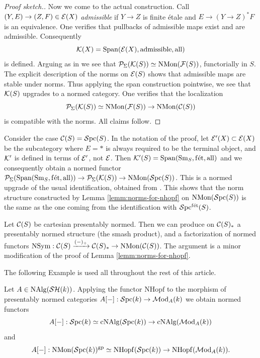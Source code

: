\documentclass{amsart}
\numberwithin{proposition}{section}
\numberwithin{equation}{section}
\def\fet{\mathrm{f\acute et}}
\def\all{\mathrm{all}}
\def\NSym{\mathrm{NSym}}
\def\NMon{\mathrm{NMon}}
\def\NHopf{\mathrm{NHopf}}
\def\cNAlg{\mathrm{cNAlg}}
\begin{document}
\begin{proof}[Proof sketch.]
Now we come to the actual construction.
Call $(Y, E) \to (Z, F) \in \mathcal E(X)$ \emph{admissible} if $Y \to Z$ is finite étale and $E \to (Y \to Z)^* F$ is an equivalence.
One verifies that pullbacks of admissible maps exist and are admissible.
Consequently \[ \scr K(X) = \Span(\scr E(X), \mathrm{admissible}, \all) \] is defined.
Arguing as in \cite[Lemma 16.17, Remark 16.18]{bachmann-norms} we see that $\PSh_\Sigma(\scr K(S)) \wequi \NMon(\scr F(S))$, functorially in $S$.
The explicit description of the norms on $\mathcal E(S)$ shows that admissible maps are stable under norms.
Thus applying the span construction pointwise, we see that $\mathcal K(S)$ upgrades to a  normed category.
One verifies that the localization \[ \PSh_\Sigma(\scr K(S)) \wequi \NMon(\scr F(S)) \to \NMon(\scr C(S)) \] is compatible with the norms.
All claims follow.
\end{proof}

\begin{remark}
Consider the case $\mathcal C(S) = \mathcal{S}\mathrm{pc}{}(S)$.
In the notation of the proof, let $\mathcal E'(X) \subset \mathcal E(X)$ be the subcategory where $E=*$ is always required to be the terminal object, and $\mathcal K'$ is defined in terms of $\mathcal E'$, not $\mathcal E$.
Then $\scr K'(S) = \Span(\Sm_S, \fet, \all)$ and we consequently obtain a normed functor $\PSh_\Sigma(\Span(\Sm_S, \fet, \all)) \to \PSh_\Sigma(\scr K(S)) \to \NMon(\Spc(S))$.
This is a normed upgrade of the usual identification, obtained from \cite[Remark 16.18]{bachmann-norms}.
This shows that the norm structure constructed by Lemma \ref{lemm:norms-for-nhopf} on $\NMon(\Spc(S))$ is the same as the one coming from the identification with $\Spc^\fet(S)$.
\end{remark}

\begin{remark} \label{rmk:smash-product-normed-str}
Let $\mathcal C(S)$ be cartesian presentably normed.
Then we can produce on $\mathcal C(S)_*$ a presentably normed structure (the smash product), and a factorization of normed functors $\NSym: \scr C(S) \xrightarrow{(\ph)_+} \scr C(S)_* \to \NMon(\scr C(S))$.
The argument is a minor modification of the proof of Lemma \ref{lemm:norms-for-nhopf}.
\end{remark}

The following Example is used all throughout the rest of this article.
\begin{example} \label{ex:homology-hopf-algebra}
Let $A \in \mathrm{NAlg}(\mathcal{SH}(k))$.
Applying the functor $\NHopf$ to the morphism of presentably normed categories $A[\mathord-]: \mathcal{S}\mathrm{pc}{}(k) \to \mathcal{M}\mathrm{od}_A(k)$ we obtain normed functors \[ A[\ph]: \Spc(k) \wequi \cNAlg(\Spc(k)) \to \cNAlg(\Mod_A(k)) \] and \[ A[\ph]: \NMon(\Spc(k))^\gp \wequi \NHopf(\Spc(k)) \to \NHopf(\Mod_A(k)). \]
\end{example}
\end{document}
